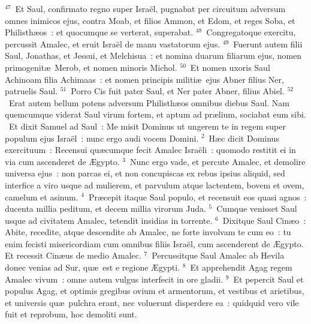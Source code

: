 ${}^{47}$~Et Saul, confirmato regno super Isra\"el, pugnabat per circuitum adversum omnes inimicos ejus, contra Moab, et filios Ammon, et Edom, et reges Soba, et Philisth\ae os~: et quocumque se verterat, superabat.
${}^{48}$~Congregatoque exercitu, percussit Amalec, et eruit Isra\"el de manu vastatorum ejus.
${}^{49}$~Fuerunt autem filii Saul, Jonathas, et Jessui, et Melchisua~: et nomina duarum filiarum ejus, nomen primogenit\ae\ Merob, et nomen minoris Michol.
${}^{50}$~Et nomen uxoris Saul Achinoam filia Achimaas~: et nomen principis militi\ae\ ejus Abner filius Ner, patruelis Saul.
${}^{51}$~Porro Cis fuit pater Saul, et Ner pater Abner, filius Abiel.
${}^{52}$~Erat autem bellum potens adversum Philisth\ae os omnibus diebus Saul. Nam quemcumque viderat Saul virum fortem, et aptum ad pr\ae lium, sociabat eum sibi.
~Et dixit Samuel ad Saul~: Me misit Dominus ut ungerem te in regem super populum ejus Isra\"el~: nunc ergo audi vocem Domini.
${}^{2}$~H\ae c dicit Dominus exercituum~: Recensui qu\ae cumque fecit Amalec Isra\"eli~: quomodo restitit ei in via cum ascenderet de \AE gypto.
${}^{3}$~Nunc ergo vade, et percute Amalec, et demolire universa ejus~: non parcas ei, et non concupiscas ex rebus ipsius aliquid, sed interfice a viro usque ad mulierem, et parvulum atque lactentem, bovem et ovem, camelum et asinum.
${}^{4}$~Pr\ae cepit itaque Saul populo, et recensuit eos quasi agnos~: ducenta millia peditum, et decem millia virorum Juda.
${}^{5}$~Cumque venisset Saul usque ad civitatem Amalec, tetendit insidias in torrente.
${}^{6}$~Dixitque Saul Cin\ae o~: Abite, recedite, atque descendite ab Amalec, ne forte involvam te cum eo~: tu enim fecisti misericordiam cum omnibus filiis Isra\"el, cum ascenderent de \AE gypto. Et recessit Cin\ae us de medio Amalec.
${}^{7}$~Percussitque Saul Amalec ab Hevila donec venias ad Sur, qu\ae\ est e regione \AE gypti.
${}^{8}$~Et apprehendit Agag regem Amalec vivum~: omne autem vulgus interfecit in ore gladii.
${}^{9}$~Et pepercit Saul et populus Agag, et optimis gregibus ovium et armentorum, et vestibus et arietibus, et universis qu\ae\ pulchra erant, nec voluerunt disperdere ea~: quidquid vero vile fuit et reprobum, hoc demoliti sunt.


